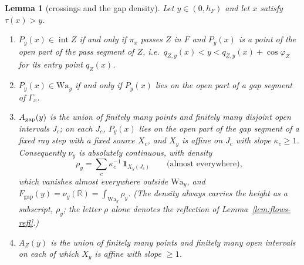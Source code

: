 \documentclass[11pt]{amsart}
\newcommand{\R}{\mathbb R}
\newcommand{\Fgap}{F_{\mathrm{gap}}}
\newtheorem{lemma}[theorem]{Lemma}
\theoremstyle{definition}
\theoremstyle{remark}
\numberwithin{equation}{section}
\begin{document}
\begin{lemma}[crossings and the gap density]\label{lem:flows-density}
Let $y\in(0,h_F)$ and let $x$ satisfy $\tau(x)>y$.
\begin{enumerate}[label=(\alph*)]
\item $P_y(x)\in\operatorname{int}Z$ if and only if $\pi_x$ passes $Z$ in $F$ and $P_y(x)$ is a point of the open part of
the pass segment of $Z$, i.e.\ $q_{Z,y}(x)<y<q_{Z,y}(x)+\cos\varphi_Z$ for its entry point $q_Z(x)$.
\item $P_y(x)\in\mathrm{Wa}_y$ if and only if $P_y(x)$ lies on the open part of a gap segment of $\Gamma_x$.
\item $A_{\rm gap}(y)$ is the union of finitely many points and finitely many disjoint open intervals $J_c$; on each
$J_c$, $P_y(x)$ lies on the open part of the gap segment of a fixed ray step with a fixed source $X_c$, and $X_y$ is affine
on $J_c$ with slope $\kappa_c\ge1$. Consequently $\nu_y$ is absolutely continuous, with density
\[
\rho_y=\sum_c\kappa_c^{-1}\,\mathbf 1_{X_y(J_c)}\qquad\text{(almost everywhere)},
\]
which vanishes almost everywhere outside $\mathrm{Wa}_y$, and $\Fgap(y)=\nu_y(\R)=\int_{\mathrm{Wa}_y}\rho_y$. (The
density always carries the height as a subscript, $\rho_y$; the letter $\rho$ alone denotes the reflection of
Lemma~\ref{lem:flows-refl}.)
\item $A_Z(y)$ is the union of finitely many points and finitely many open intervals on each of which $X_y$ is affine with
slope $\ge1$.
\end{enumerate}
\end{lemma}
\end{document}

